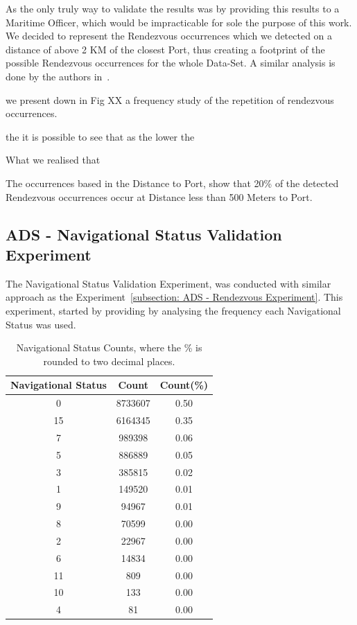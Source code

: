As the only truly way to validate the results was by providing this results to a Maritime Officer, which would be impracticable for sole the purpose of this work. We decided to represent the Rendezvous occurrences which we detected on a distance of above 2 KM of the closest Port, thus creating a footprint of the possible Rendezvous occurrences for the whole Data-Set. A similar analysis is done by the authors in~\cite{Miller2018IdentifyingBehavior}. 



we present down in Fig XX a frequency study of the repetition of rendezvous occurrences.

the it is possible to see that as the lower the 



What we realised that 


The occurrences based in the Distance to Port, show that 20\% of the detected Rendezvous occurrences occur at Distance less than 500 Meters to Port. 




\subsection{ADS - Navigational Status Validation Experiment}
\label{subsection: ADS - Navigational Status Experiment}
The Navigational Status Validation Experiment, was conducted with similar approach as the Experiment~\ref{subsection: ADS - Rendezvous Experiment}.
This experiment, started by providing by analysing the frequency each Navigational Status was used. %
\begin{table}[H]
\centering
\caption{Navigational Status Counts, where the \% is rounded to two decimal places.}
\label{Table: 5 Status Counts}
\begin{tabular}{@{}ccc@{}}
\toprule
Navigational Status & \multicolumn{1}{c}{Count} & Count(\%) \\ \midrule
0 & 8733607 & 0.50 \\
15 & 6164345 & 0.35 \\
7 & 989398 & 0.06 \\
5 & 886889 & 0.05 \\
3 & 385815 & 0.02 \\
1 & 149520 & 0.01 \\
9 & 94967 & 0.01 \\
8 & 70599 & 0.00 \\
2 & 22967 & 0.00 \\
6 & 14834 & 0.00 \\
11 & 809 & 0.00 \\
10 & 133 & 0.00 \\
4 & 81 & 0.00 \\ \bottomrule
\end{tabular}
\end{table}

